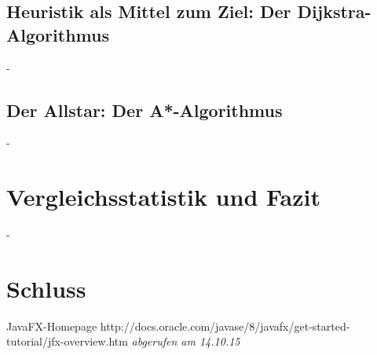 \documentclass[12pt]{article}
\begin{document}
\subsection{Heuristik als Mittel zum Ziel: Der Dijkstra-Algorithmus}
\newpage
-
\newpage

\subsection{Der Allstar: Der A*-Algorithmus}
\newpage
-
\newpage

\section{Vergleichsstatistik und Fazit}
\newpage
-
\newpage

\section{Schluss}
\newpage

\begin{thebibliography}{9}
 JavaFX-Homepage http://docs.oracle.com/javase/8/javafx/get-started-tutorial/jfx-overview.htm \emph{abgerufen am 14.10.15}
\end{thebibliography}
\end{document}
